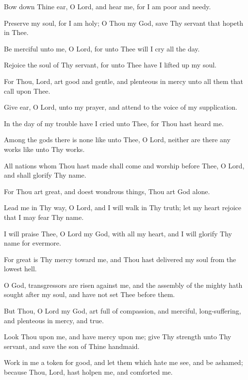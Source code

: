 Bow down Thine ear, O Lord, and hear me, for I am poor and needy.

Preserve my soul, for I am holy; O Thou my God, save Thy servant that hopeth in Thee.

Be merciful unto me, O Lord, for unto Thee will I cry all the day.

Rejoice the soul of Thy servant, for unto Thee have I lifted up my soul.

For Thou, Lord, art good and gentle, and plenteous in mercy unto all them that call upon Thee.

Give ear, O Lord, unto my prayer, and attend to the voice of my supplication.

In the day of my trouble have I cried unto Thee, for Thou hast heard me.

Among the gods there is none like unto Thee, O Lord, neither are there any works like unto Thy works.

All nations whom Thou hast made shall come and worship before Thee, O Lord, and shall glorify Thy name.

For Thou art great, and doest wondrous things, Thou art God alone.

Lead me in Thy way, O Lord, and I will walk in Thy truth; let my heart rejoice that I may fear Thy name.

I will praise Thee, O Lord my God, with all my heart, and I will glorify Thy name for evermore.

For great is Thy mercy toward me, and Thou hast delivered my soul from the lowest hell.

O God, transgressors are risen against me, and the assembly of the mighty hath sought after my soul, and have not set Thee before them.

But Thou, O Lord my God, art full of compassion, and merciful, long-suffering, and plenteous in mercy, and true.

Look Thou upon me, and have mercy upon me; give Thy strength unto Thy servant, and save the son of Thine handmaid.

Work in me a token for good, and let them which hate me see, and be ashamed; because Thou, Lord, hast holpen me, and comforted me.
